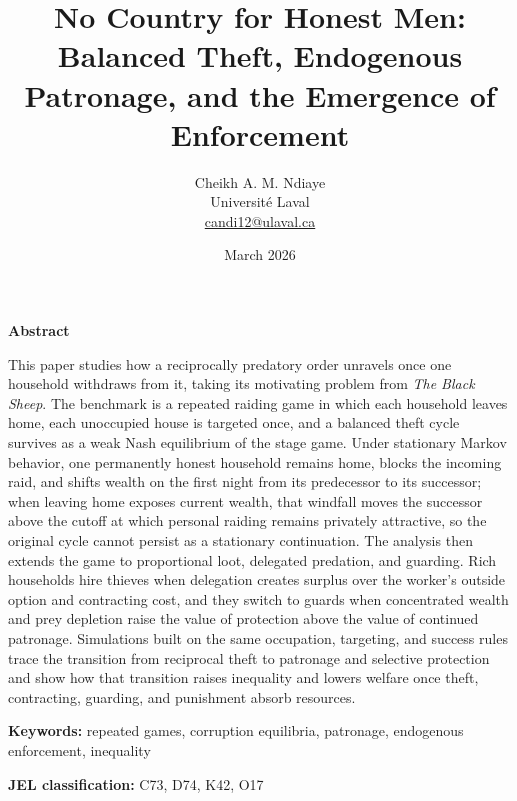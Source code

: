 \documentclass[12pt]{article}
\title{No Country for Honest Men:\\
Balanced Theft, Endogenous Patronage, and the Emergence of Enforcement}
\author{Cheikh A. M. Ndiaye\\
Université Laval\\
\href{mailto:candi12@ulaval.ca}{candi12@ulaval.ca}}
\date{March 2026}
\makeatletter
\numberwithin{equation}{section}
\renewenvironment{abstract}{
  \begin{center}
  \bfseries Abstract
  \end{center}
  \vspace{-0.7em}
  \begingroup
  \small
  \setstretch{1.18}
  \noindent
}{
  \par
  \endgroup
}
\renewcommand{\maketitle}{%
  \begin{center}
    {\Large \@title \par}
    \vspace{0.7em}
    {\normalsize \@author \par}
    \vspace{0.35em}
    {\small \@date \par}
  \end{center}
  \vspace{0.7em}
}
\makeatother
\begin{document}
\maketitle

\begin{abstract}
This paper studies how a reciprocally predatory order unravels once one household withdraws from it, taking its motivating problem from \emph{The Black Sheep}. The benchmark is a repeated raiding game in which each household leaves home, each unoccupied house is targeted once, and a balanced theft cycle survives as a weak Nash equilibrium of the stage game. Under stationary Markov behavior, one permanently honest household remains home, blocks the incoming raid, and shifts wealth on the first night from its predecessor to its successor; when leaving home exposes current wealth, that windfall moves the successor above the cutoff at which personal raiding remains privately attractive, so the original cycle cannot persist as a stationary continuation. The analysis then extends the game to proportional loot, delegated predation, and guarding. Rich households hire thieves when delegation creates surplus over the worker's outside option and contracting cost, and they switch to guards when concentrated wealth and prey depletion raise the value of protection above the value of continued patronage. Simulations built on the same occupation, targeting, and success rules trace the transition from reciprocal theft to patronage and selective protection and show how that transition raises inequality and lowers welfare once theft, contracting, guarding, and punishment absorb resources.
\end{abstract}

\noindent \textbf{Keywords:} repeated games, corruption equilibria, patronage, endogenous enforcement, inequality
\par\noindent \textbf{JEL classification:} C73, D74, K42, O17












\appendix

\end{document}
